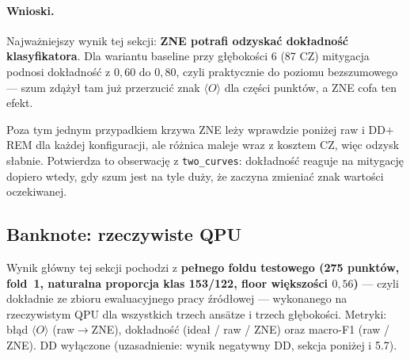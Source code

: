 \documentclass[11pt,a4paper]{article}
\begin{document}
\paragraph{Wnioski.} Najważniejszy wynik tej sekcji: \textbf{ZNE potrafi odzyskać
dokładność klasyfikatora}. Dla wariantu baseline przy głębokości 6 (87 CZ) mitygacja
podnosi dokładność z $0{,}60$ do $0{,}80$, czyli praktycznie do poziomu bezszumowego --- szum
zdążył tam już przerzucić znak $\langle O\rangle$ dla części punktów, a ZNE cofa ten efekt.

Poza tym jednym przypadkiem krzywa ZNE leży wprawdzie poniżej raw i DD${+}$REM dla każdej
konfiguracji, ale różnica maleje wraz z kosztem CZ, więc odzysk słabnie. Potwierdza to
obserwację z \texttt{two\_curves}: dokładność reaguje na mitygację dopiero wtedy, gdy szum
jest na tyle duży, że zaczyna zmieniać znak wartości oczekiwanej.

\subsection{Banknote: rzeczywiste QPU}
\label{sec:bank-qpu}

Wynik główny tej sekcji pochodzi z \textbf{pełnego foldu testowego (275 punktów, fold~1,
naturalna proporcja klas 153/122, floor większości $0{,}56$)} --- czyli dokładnie ze
zbioru ewaluacyjnego pracy źródłowej --- wykonanego na rzeczywistym QPU dla wszystkich
trzech ansätze i trzech głębokości. Metryki: błąd $\langle O\rangle$ (raw${}\to{}$ZNE),
dokładność (ideał / raw / ZNE) oraz macro-F1 (raw / ZNE). DD wyłączone (uzasadnienie:
wynik negatywny DD, sekcja poniżej i 5.7).
\end{document}
